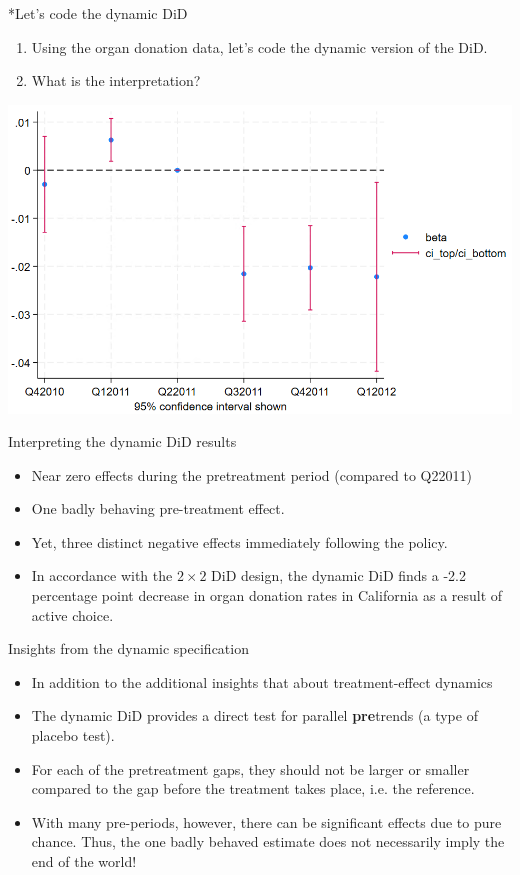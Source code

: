 \documentclass[notes,11pt, aspectratio=169]{beamer}
\begin{document}
\begin{frame}{*Let's code the dynamic DiD}
    \begin{enumerate}
        \item Using the organ donation data, let's code the dynamic version of the DiD.
        \item What is the interpretation?
    \end{enumerate}
    \vspace{1cm}
    \begin{center}
        \includegraphics[width=0.6\linewidth]{24_DiDLecture/24_DiDLecture_DynamicDiD.png}
    \end{center}
\end{frame}

\begin{frame}{Interpreting the dynamic DiD results}
\begin{itemize}
\item Near zero effects during the pretreatment period (compared to Q22011)
\item One badly behaving pre-treatment effect.
\item Yet, three distinct negative effects immediately following the policy.
\item In accordance with the $2\times2$ DiD design, the dynamic DiD finds a -2.2 percentage point decrease in organ donation rates in California as a result of active choice.
\end{itemize}
\end{frame}


\begin{frame}{Insights from the dynamic specification}
\begin{itemize}
\item In addition to the additional insights that about treatment-effect dynamics
\item The dynamic DiD provides a direct test for parallel \textbf{pre}trends (a type of placebo test).
\item For each of the pretreatment gaps, they should not be larger or smaller compared to the gap before the treatment takes place, i.e. the reference.
\item With many pre-periods, however, there can be significant effects due to pure chance. Thus, the one badly behaved estimate does not necessarily imply the end of the world!
\end{itemize}
\end{frame}
\end{document}
